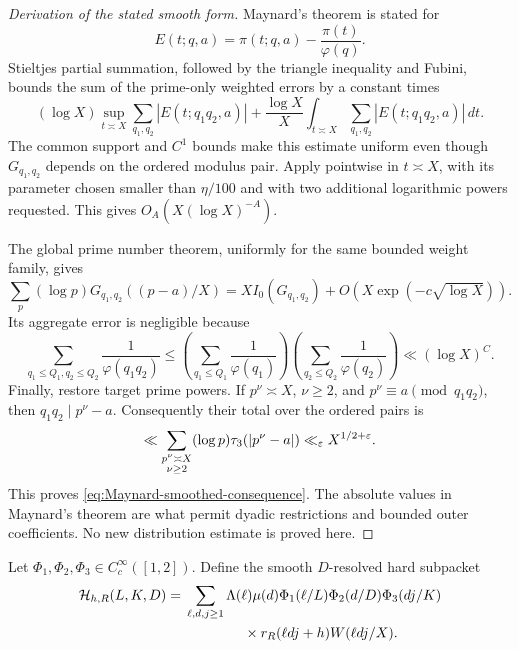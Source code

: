 \begin{proof}[Derivation of the stated smooth form]
Maynard's theorem is stated for
\[
 E(t;q,a)=\pi(t;q,a)-\frac{\pi(t)}{\varphi(q)}.
\]
Stieltjes partial summation, followed by the triangle inequality and
Fubini, bounds the sum of the prime-only weighted errors by a constant
times
\[
 (\log X)\sup_{t\asymp X}\sum_{q_1,q_2}|E(t;q_1q_2,a)|
 +\frac{\log X}{X}\int_{t\asymp X}
 \sum_{q_1,q_2}|E(t;q_1q_2,a)|\,dt.
\]
The common support and $C^1$ bounds make this estimate uniform even
though $G_{q_1,q_2}$ depends on the ordered modulus pair.  Apply
\citet[Theorem~1.1]{Maynard2025I} pointwise in $t\asymp X$, with its
parameter chosen smaller than $\eta/100$ and with two additional
logarithmic powers requested.  This gives
$O_A(X(\log X)^{-A})$.

The global prime number theorem, uniformly for the same bounded weight
family, gives
\[
 \sum_p(\log p)G_{q_1,q_2}((p-a)/X)
 =XI_0(G_{q_1,q_2})
 +O\left(X\exp(-c\sqrt{\log X})\right).
\]
Its aggregate error is negligible because
\[
 \sum_{q_1\le Q_1,q_2\le Q_2}
 \frac1{\varphi(q_1q_2)}
 \le
 \left(\sum_{q_1\le Q_1}\frac1{\varphi(q_1)}\right)
 \left(\sum_{q_2\le Q_2}\frac1{\varphi(q_2)}\right)
 \ll(\log X)^C.
\]
Finally, restore target prime powers.  If $p^\nu\asymp X$, $\nu\ge2$,
and $p^\nu\equiv a\pmod{q_1q_2}$, then $q_1q_2\mid p^\nu-a$.
Consequently their total over the ordered pairs is
\[
 \ll\sum_{\substack{p^\nu\asymp X\\\nu\ge2}}
 (\log p)\tau_3(|p^\nu-a|)
 \ll_\varepsilon X^{1/2+\varepsilon}.
\]
This proves \eqref{eq:Maynard-smoothed-consequence}.  The absolute values
in Maynard's theorem are what permit dyadic restrictions and bounded
outer coefficients.  No new distribution estimate is proved here.
\end{proof}

Let $\Phi_1,\Phi_2,\Phi_3\in C_c^\infty([1,2])$.  Define the smooth
$D$-resolved hard subpacket
\begin{align}
 \mathcal H_{h,R}(L,K,D)
 ={}&\sum_{\ell,d,j\ge1}
 \Lambda(\ell)\mu(d)
 \Phi_1(\ell/L)\Phi_2(d/D)\Phi_3(dj/K)
 \notag\\
 &\hspace{4.2em}\times
 r_R(\ell dj+h)W(\ell dj/X).
 \label{eq:three-scale-subpacket}
\end{align}

